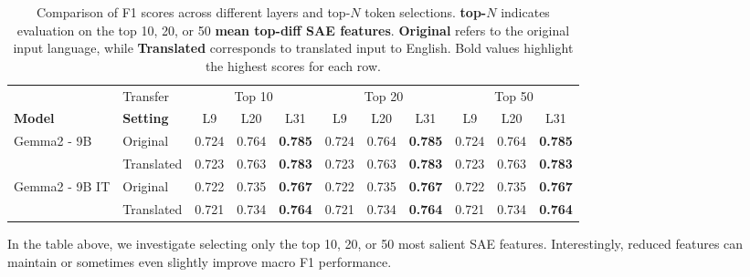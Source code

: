 \begin{table}[ht]
\centering
\caption{Comparison of F1 scores across different layers and top-$N$ token selections. 
\textbf{top-$N$} indicates evaluation on the top 10, 20, or 50 \textbf{mean top-diff SAE features}.
\textbf{Original} refers to the original input language, while \textbf{Translated} corresponds to translated input to English. 
Bold values highlight the highest scores for each row.}
\label{tab:layer_eval}
\vspace{1em}
\begin{tabular}{l l ccc ccc ccc}
\toprule
 & Transfer & \multicolumn{3}{c}{Top 10} & \multicolumn{3}{c}{Top 20} & \multicolumn{3}{c}{Top 50} \\
\cmidrule(lr){3-5} \cmidrule(lr){6-8} \cmidrule(lr){9-11}
\textbf{Model} & \textbf{Setting} & L9 & L20 & L31 & L9 & L20 & L31 & L9 & L20 & L31 \\
\midrule
\multirow{2}{*}{Gemma2 - 9B}    & Original     & 0.724 & 0.764 & \textbf{0.785}  & 0.724 & 0.764 & \textbf{0.785}  & 0.724 & 0.764 & \textbf{0.785} \\
                                & Translated   & 0.723 & 0.763 & \textbf{0.783}  & 0.723 & 0.763 & \textbf{0.783}  & 0.723 & 0.763 & \textbf{0.783} \\
\midrule
\multirow{2}{*}{Gemma2 - 9B IT} & Original     & 0.722 & 0.735 & \textbf{0.767}  & 0.722 & 0.735 & \textbf{0.767}  & 0.722 & 0.735 & \textbf{0.767} \\
                                & Translated   & 0.721 & 0.734 & \textbf{0.764}  & 0.721 & 0.734 & \textbf{0.764}  & 0.721 & 0.734 & \textbf{0.764} \\
\bottomrule
\end{tabular}
\end{table}

In the table above, we investigate selecting only the top 10, 20, or 50 most salient SAE features. Interestingly, reduced features can maintain or sometimes even slightly improve macro F1 performance. 


